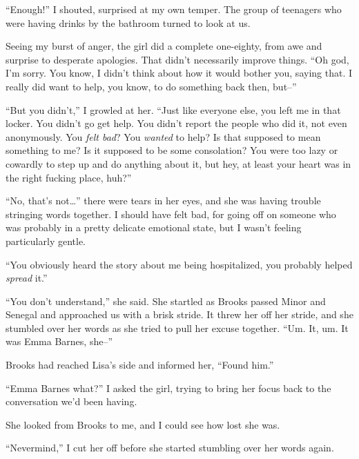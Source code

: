 ``Enough!'' I shouted, surprised at my own temper.  The group of teenagers who were having drinks by the bathroom turned to look at us.



Seeing my burst of anger, the girl did a complete one-eighty, from awe and surprise to desperate apologies.  That didn't necessarily improve things.  ``Oh god, I'm sorry.  You know, I didn't think about how it would bother you, saying that.  I really did want to help, you know, to do something back then, but--''



``But you didn't,'' I growled at her.  ``Just like everyone else, you left me in that locker.  You didn't go get help.  You didn't report the people who did it, not even anonymously.  You \emph{felt bad}?  You \emph{wanted} to help?  Is that supposed to mean something to me?  Is it supposed to be some consolation? You were too lazy or cowardly to step up and do anything about it, but hey, at least your heart was in the right fucking place, huh?''



``No, that's not\ldots'' there were tears in her eyes, and she was having trouble stringing words together.  I should have felt bad, for going off on someone who was probably in a pretty delicate emotional state, but I wasn't feeling particularly gentle.



``You obviously heard the story about me being hospitalized, you probably helped \emph{spread} it.''



``You don't understand,'' she said.  She startled as Brooks passed Minor and Senegal and approached us with a brisk stride.  It threw her off her stride, and she stumbled over her words as she tried to pull her excuse together.  ``Um.  It, um.  It was Emma Barnes, she--''



Brooks had reached Lisa's side and informed her, ``Found him.''



``Emma Barnes what?'' I asked the girl, trying to bring her focus back to the conversation we'd been having.



She looked from Brooks to me, and I could see how lost she was.



``Nevermind,'' I cut her off before she started stumbling over her words again.



